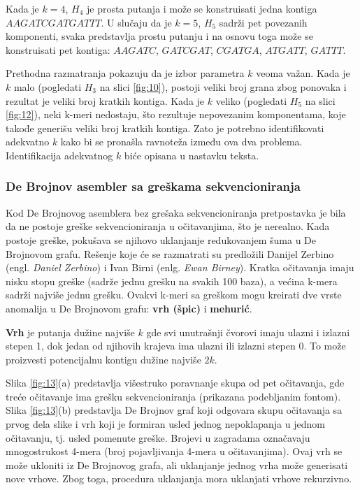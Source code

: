 \documentclass[12pt,oneside]{memoir}
\begin{document}
Kada je $k = 4$, $H_4$ je prosta putanja i može se konstruisati jedna kontiga $AAGATCGATGATTT$. U slučaju da je $k = 5$, $H_5$ sadrži pet povezanih komponenti, svaka predstavlja prostu putanju i na osnovu toga može se konstruisati pet kontiga: $AAGATC$, $GATCGAT$, $CGATGA$, $ATGATT$, $GATTT$.

Prethodna razmatranja pokazuju da je izbor parametra $k$ veoma važan. Kada je $k$ malo (pogledati $H_3$ na slici \ref{fig:10}), postoji veliki broj grana zbog ponovaka i rezultat je veliki broj kratkih kontiga. Kada je $k$ veliko (pogledati $H_5$ na slici \ref{fig:12}), neki k-meri nedostaju, što rezultuje nepovezanim komponentama, koje takođe generišu veliki broj kratkih kontiga. Zato je potrebno identifikovati adekvatno $k$ kako bi se pronašla ravnoteža između ova dva problema. Identifikacija adekvatnog $k$ biće opisana u nastavku teksta.

\subsubsection{De Brojnov asembler sa greškama sekvencioniranja}

Kod De Brojnovog asemblera bez grešaka sekvencioniranja pretpostavka je bila da ne postoje greške sekvencioniranja u očitavanjima, što je nerealno. Kada postoje greške, pokušava se njihovo uklanjanje redukovanjem šuma u De Brojnovom grafu. Rešenje koje će se razmatrati su predložili Danijel Zerbino (engl. \textit{Daniel Zerbino}) i Ivan Birni (enlg. \textit{Ewan Birney}). Kratka očitavanja imaju nisku stopu greške (sadrže jednu grešku na svakih 100 baza), a većina k-mera sadrži najviše jednu grešku. Ovakvi k-meri sa greškom mogu kreirati dve vrste anomalija u De Brojnovom grafu: \textbf{vrh (špic)} i \textbf{mehurić}.

\textbf{Vrh} je putanja dužine najviše $k$ gde svi unutrašnji čvorovi imaju ulazni i izlazni stepen 1, dok jedan od njihovih krajeva ima ulazni ili izlazni stepen 0. To može proizvesti potencijalnu kontigu dužine najviše $2k$.

Slika \ref{fig:13}(a) predstavlja višestruko poravnanje skupa od pet očitavanja, gde treće očitavanje ima grešku sekvencioniranja (prikazana podebljanim fontom). Slika \ref{fig:13}(b) predstavlja De Brojnov graf koji odgovara skupu očitavanja sa prvog dela slike i vrh koji je formiran usled jednog nepoklapanja u jednom očitavanju, tj. usled pomenute greške. Brojevi u zagradama označavaju mnogostrukost 4-mera (broj pojavljivanja 4-mera u očitavanjima). Ovaj vrh se može ukloniti iz De Brojnovog grafa, ali uklanjanje jednog vrha može generisati nove vrhove. Zbog toga, procedura uklanjanja mora uklanjati vrhove rekurzivno.
\end{document}
